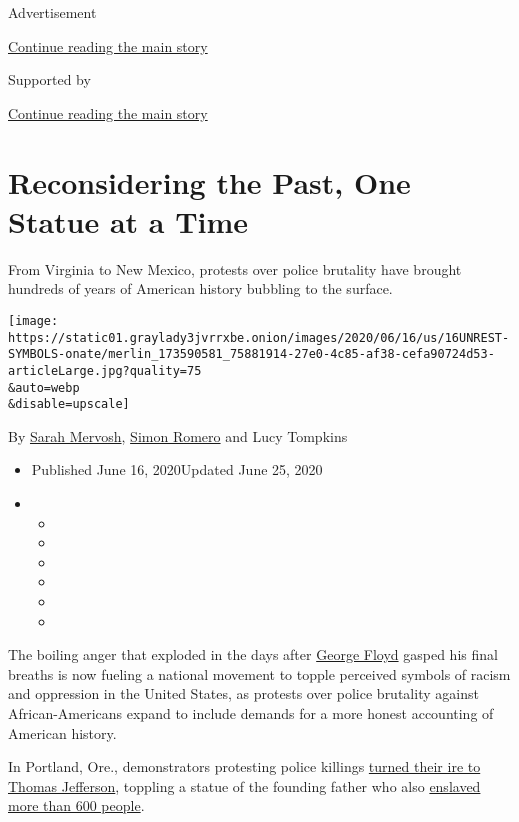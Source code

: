 Advertisement

\protect\hyperlink{after-top}{Continue reading the main story}

Supported by

\protect\hyperlink{after-sponsor}{Continue reading the main story}

\hypertarget{reconsidering-the-past-one-statue-at-a-time}{%
\section{Reconsidering the Past, One Statue at a
Time}\label{reconsidering-the-past-one-statue-at-a-time}}

From Virginia to New Mexico, protests over police brutality have brought
hundreds of years of American history bubbling to the surface.

\texttt{[image: https://static01.graylady3jvrrxbe.onion/images/2020/06/16/us/16UNREST-SYMBOLS-onate/merlin\_173590581\_75881914-27e0-4c85-af38-cefa90724d53-articleLarge.jpg?quality=75\\\&auto=webp\\\&disable=upscale]}

By \href{https://www.nytimes3xbfgragh.onion/by/sarah-mervosh}{Sarah
Mervosh},
\href{https://www.nytimes3xbfgragh.onion/by/simon-romero}{Simon Romero}
and Lucy Tompkins

\begin{itemize}
\item
  Published June 16, 2020Updated June 25, 2020
\item
  \begin{itemize}
  \item
  \item
  \item
  \item
  \item
  \item
  \end{itemize}
\end{itemize}

The boiling anger that exploded in the days after
\href{https://www.nytimes3xbfgragh.onion/article/george-floyd-who-is.html}{George
Floyd} gasped his final breaths is now fueling a national movement to
topple perceived symbols of racism and oppression in the United States,
as protests over police brutality against African-Americans expand to
include demands for a more honest accounting of American history.

In Portland, Ore., demonstrators protesting police killings
\href{https://www.oregonlive.com/portland/2020/06/protesters-take-down-thomas-jefferson-statue-in-front-of-portlands-jefferson-high-school.html}{turned
their ire to Thomas Jefferson}, toppling a statue of the founding father
who also
\href{https://www.monticello.org/slavery/slavery-faqs/property/}{enslaved
more than 600 people}.

